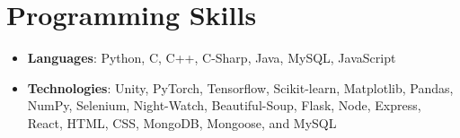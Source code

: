 \documentclass[letterpaper,11pt]{article}
\newcommand{\resumeItem}[2]{
  \item\small{
    \textbf{#1}{: #2 \vspace{-2pt}}
  }
}
\newcommand{\resumeSubItem}[2]{\resumeItem{#1}{#2}\vspace{-4pt}}
\newcommand{\resumeSubHeadingListStart}{\begin{itemize}[leftmargin=*]}
\newcommand{\resumeSubHeadingListEnd}{\end{itemize}}
\begin{document}
%
\section{Programming Skills}
 \resumeSubHeadingListStart
    \resumeSubItem {Languages}
    {Python, C, C++, C-Sharp, Java, MySQL, JavaScript}
    \resumeSubItem {Technologies}
    {Unity, PyTorch, Tensorflow, Scikit-learn, Matplotlib, Pandas, NumPy, Selenium, Night-Watch, Beautiful-Soup, Flask, Node, Express, React, HTML, CSS, MongoDB, Mongoose, and MySQL}
 \resumeSubHeadingListEnd


\end{document}
